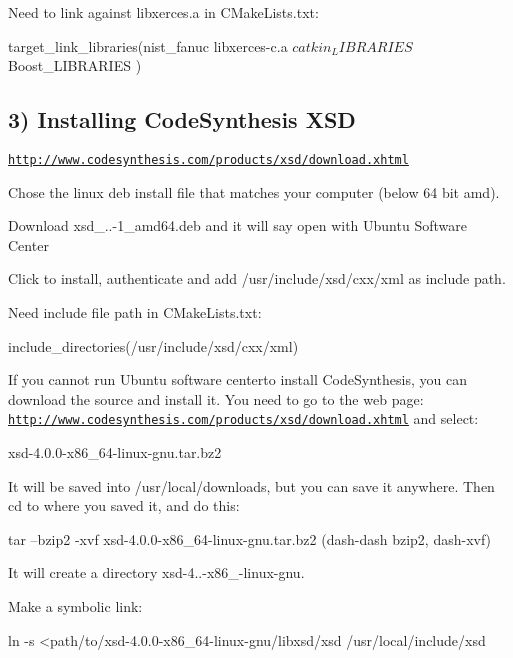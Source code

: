 Need to link against libxerces.\-a in C\-Make\-Lists.\-txt\-: \begin{DoxyVerb}target_link_libraries(nist_fanuc 
libxerces-c.a  
${catkin_LIBRARIES}
${Boost_LIBRARIES}
)
\end{DoxyVerb}


\subsection*{3) Installing Code\-Synthesis X\-S\-D }

\href{http://www.codesynthesis.com/products/xsd/download.xhtml}{\tt http\-://www.\-codesynthesis.\-com/products/xsd/download.\-xhtml}
\begin{DoxyEnumerate}
\item Chose the linux deb install file that matches your computer (below 64 bit amd).
\item Download xsd\-\_..-\/1\-\_\-amd64.\-deb and it will say open with Ubuntu Software Center
\item Click to install, authenticate and add /usr/include/xsd/cxx/xml as include path.
\end{DoxyEnumerate}

Need include file path in C\-Make\-Lists.\-txt\-: \begin{DoxyVerb}include_directories(/usr/include/xsd/cxx/xml)
\end{DoxyVerb}


If you cannot run Ubuntu software centerto install Code\-Synthesis, you can download the source and install it. You need to go to the web page\-: \href{http://www.codesynthesis.com/products/xsd/download.xhtml}{\tt http\-://www.\-codesynthesis.\-com/products/xsd/download.\-xhtml} and select\-: \begin{DoxyVerb}xsd-4.0.0-x86_64-linux-gnu.tar.bz2
\end{DoxyVerb}


It will be saved into /usr/local/downloads, but you can save it anywhere. Then cd to where you saved it, and do this\-: \begin{DoxyVerb}tar --bzip2 -xvf xsd-4.0.0-x86_64-linux-gnu.tar.bz2 (dash-dash bzip2, dash-xvf)
\end{DoxyVerb}


It will create a directory xsd-\/4..-\/x86\-\_-\/linux-\/gnu.

Make a symbolic link\-: \begin{DoxyVerb}ln -s <path/to/xsd-4.0.0-x86_64-linux-gnu/libxsd/xsd /usr/local/include/xsd
\end{DoxyVerb}


